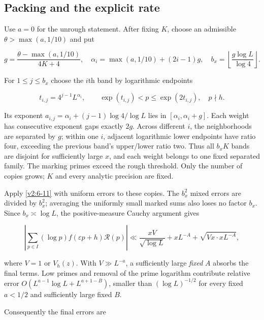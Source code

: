 \documentclass[11pt]{article}
\theoremstyle{definition}
\theoremstyle{remark}
\numberwithin{equation}{section}
\begin{document}
\subsection{Packing and the explicit rate}\label{subsec:packing}
Use $a=0$ for the unrough statement. After fixing $K$, choose an admissible $\theta>\max(a,1/10)$ and put


\begin{equation}
g=\frac{\theta-\max(a,1/10)}{4K+4},\quad
\alpha_i=\max(a,1/10)+(2i-1)g,\quad
b_x=\left\lfloor\frac{g\log L}{\log4}\right\rfloor.
\end{equation}


For $1\le j\le b_x$ choose the $i$th band by logarithmic endpoints


\begin{equation}\label{v2:10-1}
t_{i,j}=4^{j-1}L^{\alpha_i},\qquad
\exp(t_{i,j})<p\le\exp(2t_{i,j}),\quad p\nmid h.
\end{equation}


Its exponent $a_{i,j}=\alpha_i+(j-1)\log4/\log L$ lies in $[\alpha_i,\alpha_i+g]$. Each weight has consecutive exponent gaps exactly $2g$. Across different $i$, the neighborhoods are separated by $g$; within one $i$, adjacent logarithmic lower endpoints have ratio four, exceeding the previous band's upper/lower ratio two. Thus all $b_xK$ bands are disjoint for sufficiently large $x$, and each weight belongs to one fixed separated family. The marking primes exceed the rough threshold. Only the number of copies grows; $K$ and every analytic precision are fixed.

Apply \eqref{v2:6-11} with uniform errors to these copies. The $b_x^2$ mixed errors are divided by $b_x^2$; averaging the uniformly small marked sums also loses no factor $b_x$. Since $b_x\asymp\log L$, the positive-measure Cauchy argument gives


\begin{equation}\label{v2:10-2}
\left|\sum_{p\in I}(\log p)f(\varepsilon p+h)\mathcal R(p)\right|
\ll \frac{xV}{\sqrt{\log L}}+xL^{-A}+\sqrt{Vx\cdot xL^{-A}},
\end{equation}


where $V=1$ or $V_h(z)$. With $V\gg L^{-a}$, a sufficiently large \emph{fixed} $A$ absorbs the final terms. Low primes and removal of the prime logarithm contribute relative error $O(L^{a-1}\log L+L^{a+1-B})$, smaller than $(\log L)^{-1/2}$ for every fixed $a<1/2$ and sufficiently large fixed $B$.

Consequently the final errors are
\end{document}
